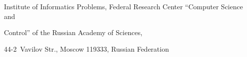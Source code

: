 \titel{\tit}{\aut}{\autkol}{\titkol}





\vspace*{-11pt}











\noindent


Institute of Informatics Problems, Federal Research Center ``Computer Science and 


Control'' of the Russian Academy of Sciences,  


44-2~Vavilov Str., Moscow 119333, Russian Federation





\def\leftfootline{\small{\textbf{\thepage}


\hfill Sistemy i Sredstva Informatiki~---


Systems and Means of Informatics 2020 vol~30 no\,4}


}%


 \def\rightfootline{\small{Sistemy i Sredstva 


Informatiki~---


 Systems and Means of Informatics 2020 vol~30 no\,4


\hfill \textbf{\thepage}}}


  


  


\vspace*{3pt}








